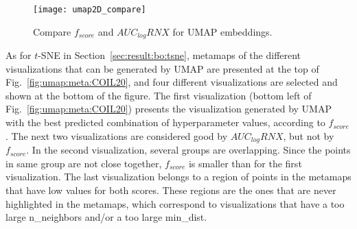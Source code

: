 \begin{figure}[ht!]
    \centering
    \texttt{[image: umap2D\_compare]}
    \caption{Compare $f_{score}$ and $AUC_{log}RNX$ for UMAP embeddings.}
    \label{fig:score:umap2D:compare}
\end{figure}

As for $t$-SNE in Section~\ref{sec:result:bo:tsne}, metamaps of the different visualizations that can be generated by UMAP are presented at the top of Fig.~\ref{fig:umap:meta:COIL20}, and four different visualizations are selected and shown at the bottom of the figure.
The first visualization (bottom left of Fig.~\ref{fig:umap:meta:COIL20}) presents the visualization generated by UMAP with the best predicted combination of hyperparameter values, according to $f_{score}$.
The next two visualizations are considered good by $AUC_{log}RNX$, but not by $f_{score}$.
In the second visualization, several groups are overlapping. Since the points in same group are not close together, $f_{score}$ is smaller than for the first visualization.
The last visualization belongs to a region of points in the metamaps that have low values for both scores.
These regions are the ones that are never highlighted in the metamaps, which correspond to visualizations that have a too large {n\_neighbors} and/or a too large {min\_dist}. 

